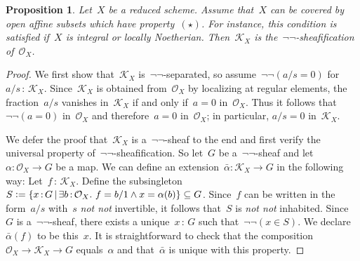 \documentclass[10pt]{amsart}
\theoremstyle{definition}
\theoremstyle{plain}
\newtheorem{prop}[defn]{Proposition}
\theoremstyle{remark}
\renewcommand{\O}{\mathcal{O}}
\newcommand{\K}{\mathcal{K}}
\newcommand{\?}{\,{:}\,}
\renewcommand{\_}{\mathpunct{.}\,}
\newcommand{\notnot}{\emph{not not}\xspace}
\newcommand{\defeq}{\vcentcolon=}
\begin{document}
\begin{prop}
\label{prop:kx-is-negneg-sheafification}
Let~$X$ be a reduced scheme. Assume that~$X$ can be covered by open affine
subsets which have property~$(\star)$. For instance, this condition is satisfied
if~$X$ is integral or locally Noetherian. Then~$\K_X$ is
the~$\neg\neg$-sheafification of~$\O_X$.\end{prop}
\begin{proof}
We first show that~$\K_X$ is~$\neg\neg$-separated,
so assume~$\neg\neg(a/s = 0)$ for~$a/s \? \K_X$. Since~$\K_X$ is obtained
from~$\O_X$ by localizing at regular elements, the fraction~$a/s$ vanishes
in~$\K_X$ if and only if~$a = 0$ in~$\O_X$. Thus it follows that~$\neg\neg(a =
0)$ in~$\O_X$ and therefore~$a = 0$ in~$\O_X$; in particular, $a/s = 0$ in~$\K_X$.

We defer the proof that~$\K_X$ is a~$\neg\neg$-sheaf to the end and first
verify the universal property of~$\neg\neg$-sheafification.
So let~$G$ be a~$\neg\neg$-sheaf and let~$\alpha : \O_X \to G$ be a map. We
can define an extension~$\bar\alpha : \K_X \to G$ in the following way:
Let~$f \? \K_X$. Define the subsingleton~$S \defeq \{ x \? G \,|\, \exists
b\?\O_X\_ f = b/1 \wedge x = \alpha(b) \} \subseteq G$. Since~$f$ can be
written in the form~$a/s$ with~$s$ \notnot invertible, it follows that~$S$
is \notnot inhabited. Since~$G$ is a~$\neg\neg$-sheaf, there exists a
unique~$x\?G$ such that~$\neg\neg(x \in S)$. We declare~$\bar\alpha(f)$ to be
this~$x$. It is straightforward to check that the composition~$\O_X \to \K_X
\to G$ equals~$\alpha$ and that~$\bar\alpha$ is unique with this property.


\end{proof}
\end{document}
